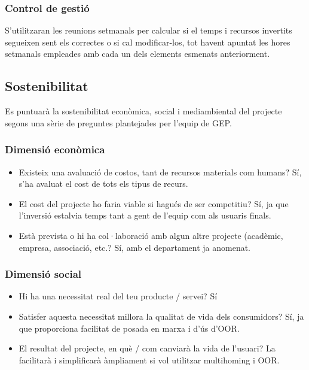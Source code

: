 \documentclass[11pt]{article}
\begin{document}
\subsubsection{Control de gestió}
S’utilitzaran les reunions setmanals per calcular si el temps i recursos invertits segueixen sent els correctes o si cal modificar-los, tot havent apuntat les hores setmanals empleades amb cada un dels elements esmenats anteriorment.

\subsection{Sostenibilitat}
Es puntuarà la sostenibilitat econòmica, social i mediambiental del projecte segons una sèrie de preguntes plantejades per l’equip de GEP.
\subsubsection{Dimensió econòmica}
\begin{itemize}
\item Existeix una avaluació de costos, tant de recursos materials com humans? Sí, s’ha avaluat el cost de tots els tipus de recurs.
\item El cost del projecte ho faria viable si hagués de ser competitiu? Sí, ja que l’inversió estalvia temps tant a gent de l’equip com als usuaris finals.
\item Està prevista o hi ha col·laboració amb algun altre projecte (acadèmic, empresa, associació, etc.? Sí, amb el departament ja anomenat.
\end{itemize}
\subsubsection{Dimensió social}
\begin{itemize}
\item Hi ha una necessitat real del teu producte / servei? Sí
\item Satisfer aquesta necessitat millora la qualitat de vida dels consumidors? Sí, ja que proporciona facilitat de posada en marxa i d’ús d’OOR.
\item El resultat del projecte, en què / com canviarà la vida de l'usuari? La facilitarà i simplificarà àmpliament si vol utilitzar multihoming i OOR.
\end{itemize}
\end{document}
